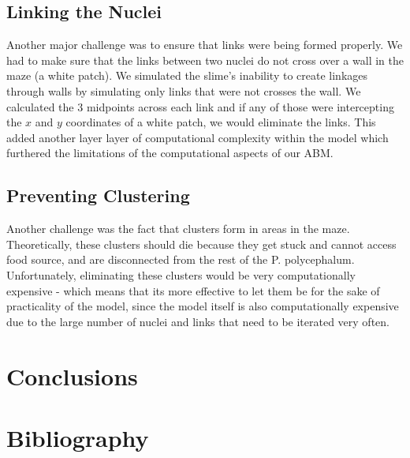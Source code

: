 \documentclass[a4paper, 11pt]{article}
\begin{document}
\subsection{Linking the Nuclei}
Another major challenge was to ensure that links were being formed properly. We had to make sure that the links between two nuclei do not cross over a wall in the maze (a white patch). We simulated the slime's inability to create linkages through walls by simulating only links that were not crosses the wall. We calculated the 3 midpoints across each link and if any of those were intercepting the $x$ and $y$ coordinates of a white patch, we would eliminate the links. This added another layer layer of computational complexity within the model which furthered the limitations of the computational aspects of our ABM. 
\subsection{Preventing Clustering}
Another challenge was the fact that clusters form in areas in the maze. Theoretically, these clusters should die because they get stuck and cannot access food source, and are disconnected from the rest of the P. polycephalum. Unfortunately, eliminating these clusters would be very computationally expensive - which means that its more effective to let them be for the sake of practicality of the model, since the model itself is also computationally expensive due to the large number of nuclei and links that need to be iterated very often.  
\section{Conclusions}
\newpage
\section{Bibliography}

\end{document}
